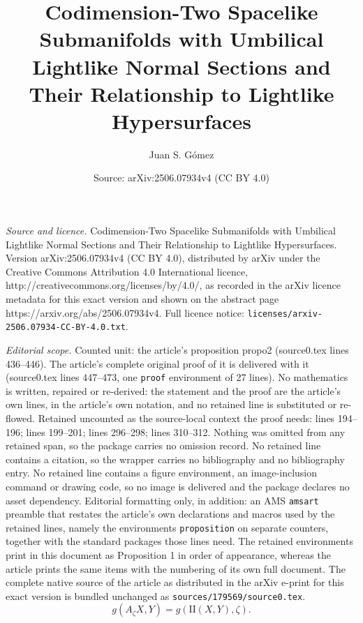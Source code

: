 \documentclass[10pt,a4paper]{amsart}
\title{Codimension-Two Spacelike Submanifolds with Umbilical Lightlike Normal Sections and Their Relationship to Lightlike Hypersurfaces}
\author{Juan S. G\'omez}
\date{Source: arXiv:2506.07934v4 (CC BY 4.0)}
\begin{document}
\maketitle

\noindent\emph{Source and licence.} Codimension-Two Spacelike Submanifolds with Umbilical Lightlike Normal Sections and Their Relationship to Lightlike Hypersurfaces. Version arXiv:2506.07934v4 (CC BY 4.0), distributed by arXiv under the Creative Commons Attribution 4.0 International licence, http://creativecommons.org/licenses/by/4.0/, as recorded in the arXiv licence metadata for this exact version and shown on the abstract page https://arxiv.org/abs/2506.07934v4. Full licence notice: \texttt{licenses/arxiv-2506.07934-CC-BY-4.0.txt}.\par\smallskip

\noindent\textit{Editorial scope.} Counted unit: the article's proposition propo2 (source0.tex lines 436--446). The article's complete original proof of it is delivered with it (source0.tex lines 447--473, one \texttt{proof} environment of 27 lines). No mathematics is written, repaired or re-derived: the statement and the proof are the article's own lines, in the article's own notation, and no retained line is substituted or re-flowed.  Retained uncounted as the source-local context the proof needs: lines 194--196; lines 199--201; lines 296--298; lines 310--312.  Nothing was omitted from any retained span, so the package carries no omission record.  No retained line contains a citation, so the wrapper carries no bibliography and no bibliography entry.  No retained line contains a figure environment, an image-inclusion command or drawing code, so no image is delivered and the package declares no asset dependency.  Editorial formatting only, in addition: an AMS \texttt{amsart} preamble that restates the article's own declarations and macros used by the retained lines, namely the environments \texttt{proposition} on separate counters, together with the standard packages those lines need.  The retained environments print in this document as Proposition 1 in order of appearance, whereas the article prints the same items with the numbering of its own full document.  The complete native source of the article as distributed in the arXiv e-print for this exact version is bundled unchanged as \texttt{sources/179569/source0.tex}.
	\begin{equation} \label{relation}
		g( A_\zeta X, Y) = g( \mathrm{II}(X,Y), \zeta ).
	\end{equation}
\end{document}
